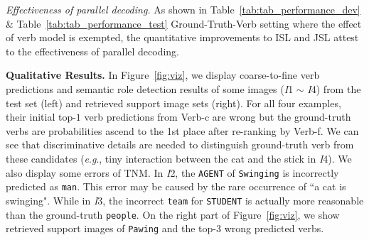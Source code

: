 \documentclass[letterpaper]{article} %
\newcommand{\eg}{\textit{e}.\textit{g}.}
\begin{document}
\noindent\emph{Effectiveness of parallel decoding.} As shown in Table~\ref{tab:tab_performance_dev} \& Table~\ref{tab:tab_performance_test} Ground-Truth-Verb setting where the effect of verb model is exempted, the quantitative improvements to ISL and JSL attest to the effectiveness of parallel decoding.

\noindent\textbf{Qualitative Results.}
In Figure~\ref{fig:viz}, we display coarse-to-fine verb predictions and semantic role detection results of some images (\textit{I}1 
$\sim$ \textit{I}4) from the test set (left) and retrieved support image sets (right). For all four examples, their initial top-$1$ verb predictions from Verb-c are wrong but the ground-truth verbs are probabilities ascend to the 1st place after re-ranking by Verb-f. 
We can see that discriminative details are needed to distinguish ground-truth verb from these candidates (\eg, tiny interaction between the cat and the stick in \textit{I}4).
We also display some errors of TNM.
In \textit{I}2, the \texttt{AGENT} of \texttt{Swinging} is incorrectly predicted as \texttt{man}. This error may be caused by the rare occurrence of ``a cat is swinging".
While in \textit{I}3, the incorrect \texttt{team} for \texttt{STUDENT} is actually more reasonable than the ground-truth \texttt{people}. On the right part of Figure~\ref{fig:viz}, we show retrieved support images of \texttt{Pawing} and the top-3 wrong predicted verbs.


\end{document}
